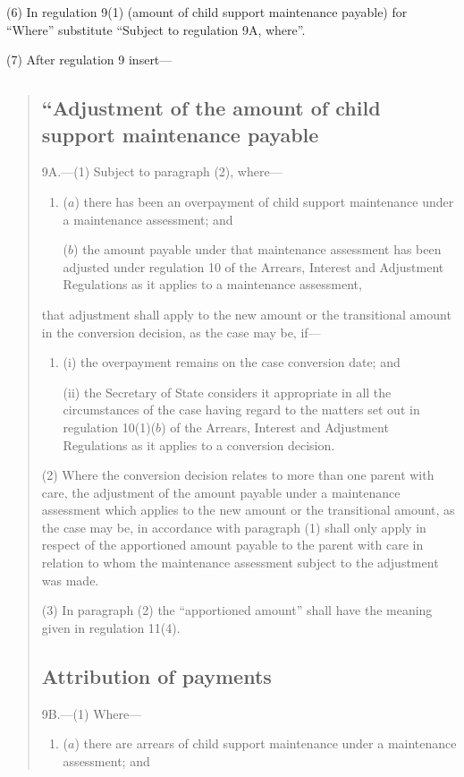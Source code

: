 \documentclass[12pt,a4paper]{article}
\begin{document}
(6) In regulation 9(1) (amount of child support maintenance payable) for “Where” substitute “Subject to regulation 9A, where”.

(7) After regulation 9 insert—
\begin{quotation}
\subsection*{“Adjustment of the amount of child support maintenance payable}

9A.---(1)  Subject to paragraph (2), where—
\begin{enumerate}\item[]
($a$) there has been an overpayment of child support maintenance under a maintenance assessment; and

($b$) the amount payable under that maintenance assessment has been adjusted under regulation 10 of the Arrears, Interest and Adjustment Regulations as it applies to a maintenance assessment,
\end{enumerate}
that adjustment shall apply to the new amount or the transitional amount in the conversion decision, as the case may be, if—
\begin{enumerate}\item[]
(i) the overpayment remains on the case conversion date; and

(ii) the Secretary of State considers it appropriate in all the circumstances of the case having regard to the matters set out in regulation 10(1)($b$)  of the Arrears, Interest and Adjustment Regulations as it applies to a conversion decision.
\end{enumerate}

(2) Where the conversion decision relates to more than one parent with care, the adjustment of the amount payable under a maintenance assessment which applies to the new amount or the transitional amount, as the case may be, in accordance with paragraph (1) shall only apply in respect of the apportioned amount payable to the parent with care in relation to whom the maintenance assessment subject to the adjustment was made.

(3) In paragraph (2) the “apportioned amount” shall have the meaning given in regulation 11(4).

\subsection*{Attribution of payments}

9B.---(1)  Where—
\begin{enumerate}\item[]
($a$) there are arrears of child support maintenance under a maintenance assessment; and


\end{enumerate}
\end{quotation}
\end{document}
